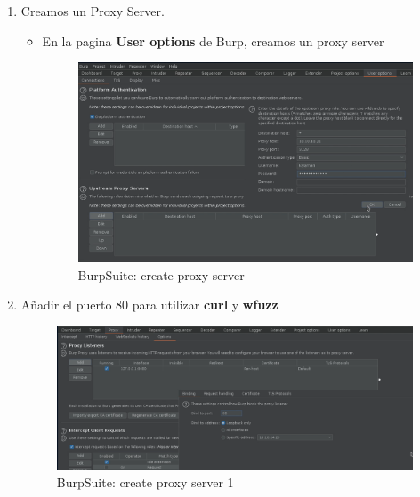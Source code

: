 \documentclass{assets/ipesethesis}
\begin{document}
\begin{enumerate}
\def\labelenumi{\arabic{enumi}.}
\item
  Creamos un Proxy Server.

  \begin{itemize}
  \item
    En la pagina \textbf{User options} de Burp, creamos un proxy server

    \begin{figure}
      \includegraphics[width=0.9\linewidth]{images/burp-create-proxy-server} \caption{BurpSuite: create proxy server}\label{fig:unnamed-chunk-6}
      \end{figure}
  \end{itemize}
\item
  Añadir el puerto 80 para utilizar \textbf{curl} y \textbf{wfuzz}

  \begin{figure}
   \includegraphics[width=0.9\linewidth]{images/burp-add-port-80-1} \caption{BurpSuite: create proxy server 1}\label{fig:unnamed-chunk-7}
   \end{figure}


\end{enumerate}
\end{document}
